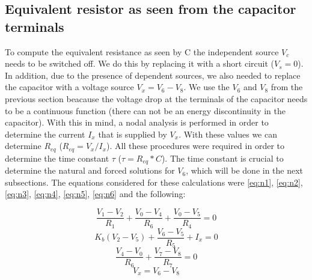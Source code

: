\subsection{Equivalent resistor as seen from the capacitor terminals}

To compute the equivalent resistance as seen by C the independent source $V_c$ needs to be switched off. We do this by replacing it with a short circuit ($V_s=0$). In addition, due to the presence of dependent sources, we also needed to replace the capacitor with a voltage source $V_x=V_6-V_8$. We use the $V_6$ and $V_8$ from the previous section beacause the voltage drop at the terminals of the capacitor needs to be a continuous function (there can not be an energy discontinuity in the capacitor). With this in mind, a nodal analysis is performed in order to determine the current $I_x$ that is supplied by $V_x$. With these values we can determine $R_{eq}$ ($R_{eq}=V_x/I_x$). All these procedures were required in order to determine the time constant $\tau$ ($\tau=R_{eq}*C$). The time constant is crucial to determine the natural and forced solutions for $V_6$, which will be done in the next subsections. The equations considered for these calculations were \ref{eq:n1}, \ref{eq:n2}, \ref{eq:n3}, \ref{eq:n4}, \ref{eq:n5}, \ref{eq:n6} and the following:


\begin {equation}
	\frac{V_1-V_2}{R_1} + \frac{V_0-V_4}{R_6} + \frac{V_0-V_5}{R_4} = 0
	\label{eq:eq7}
\end{equation}
\begin {equation}
	K_b(V_2-V_5) + \frac{V_6-V_5}{R_5} + I_x  = 0
	\label{eq:eq8}
\end{equation}
\begin {equation}
	\frac{V_4-V_0}{R_6} + \frac{V_7 - V_8}{R_7} = 0
	\label{eq:eq9}
\end{equation}
\begin {equation}
	V_x = V_6 - V_8
	\label{eq:eq10}
\end{equation}


